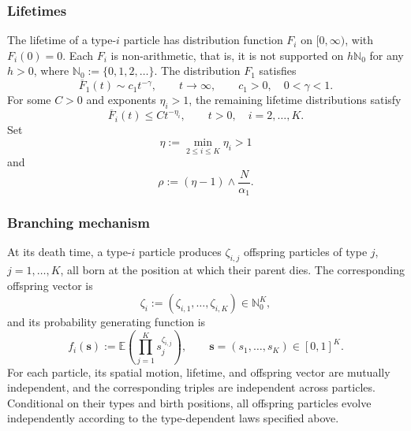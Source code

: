 \documentclass[reqno,final,11pt]{amsart}
\newcommand{\N}{\mathbb N}
\newcommand{\E}{\mathbb E}
\theoremstyle{plain}
\theoremstyle{definition}
\theoremstyle{remark}
\numberwithin{equation}{section}
\begin{document}
\subsubsection{Lifetimes}

The lifetime of a type-\(i\) particle has distribution function \(F_i\) on \([0,\infty)\), with \(F_i(0)=0\). Each \(F_i\) is non-arithmetic, that is, it is not supported on \(h\N_0\) for any \(h>0\), where \(\N_0:=\{0,1,2,\dots\}\). The distribution \(F_1\) satisfies
\begin{equation}\label{eq:F1-heavy-tail}
  \overline F_1(t)\sim c_1t^{-\gamma},
  \qquad t\to\infty,
  \qquad c_1>0,\quad 0<\gamma<1.
\end{equation}
For some \(C>0\) and exponents \(\eta_i>1\), the remaining lifetime distributions satisfy
\begin{equation}\label{eq:finite-type-tails}
  \overline F_i(t)\le Ct^{-\eta_i},
  \qquad t>0,\quad i=2,\dots,K.
\end{equation}
Set
\begin{equation}\label{eq:eta-def}
  \eta:=\min_{2\le i\le K}\eta_i>1
\end{equation}
and
\begin{equation}\label{eq:rho-def}
  \rho:=\left(\eta-1\right)\wedge\frac{N}{\alpha_1}.
\end{equation}

\subsubsection{Branching mechanism}

At its death time, a type-\(i\) particle produces \(\zeta_{i,j}\) offspring particles of type \(j\), \(j=1,\dots,K\), all born at the position at which their parent dies. The corresponding offspring vector is
\[
  \zeta_i:=(\zeta_{i,1},\dots,\zeta_{i,K})\in\N_0^K,
\]
and its probability generating function is
\[
  f_i(\mathbf s):=\E\left(\prod_{j=1}^K s_j^{\zeta_{i,j}}\right),
  \qquad
  \mathbf s=(s_1,\dots,s_K)\in[0,1]^K.
\]
For each particle, its spatial motion, lifetime, and offspring vector are mutually independent, and the corresponding triples are independent across particles. Conditional on their types and birth positions, all offspring particles evolve independently according to the type-dependent laws specified above.
\end{document}

